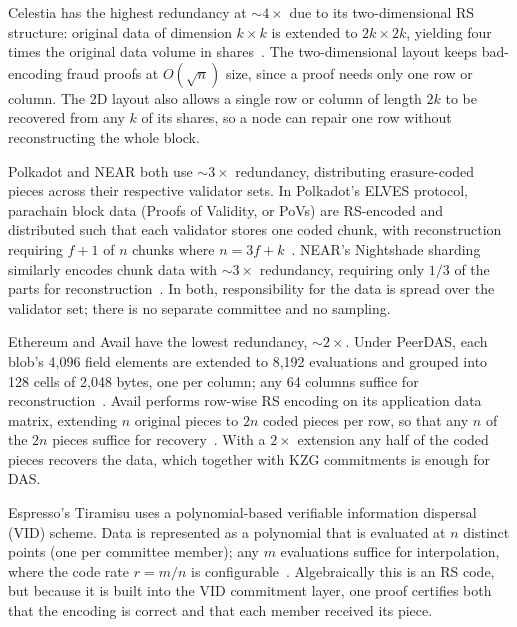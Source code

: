 Celestia has the highest redundancy at ${\sim}4\times$ due to its two-dimensional RS structure: original data of dimension $k \times k$ is extended to $2k \times 2k$, yielding four times the original data volume in shares~\cite{AlBassam_LazyLedger}.
The two-dimensional layout keeps bad-encoding fraud proofs at $O(\sqrt{n})$ size, since a proof needs only one row or column.
The 2D layout also allows a single row or column of length $2k$ to be recovered from any $k$ of its shares, so a node can repair one row without reconstructing the whole block.

Polkadot and NEAR both use ${\sim}3\times$ redundancy, distributing erasure-coded pieces across their respective validator sets.
In Polkadot's ELVES protocol, parachain block data (Proofs of Validity, or PoVs) are RS-encoded and distributed such that each validator stores one coded chunk, with reconstruction requiring $f{+}1$ of $n$ chunks where $n = 3f + k$~\cite{Jeff_Burdges_ELVES, Overview_of_polkadot}.
NEAR's Nightshade sharding similarly encodes chunk data with ${\sim}3\times$ redundancy, requiring only $1/3$ of the parts for reconstruction~\cite{NEAR_Nightshade_Scaling_Blockchain}.
In both, responsibility for the data is spread over the validator set; there is no separate committee and no sampling.

Ethereum and Avail have the lowest redundancy, ${\sim}2\times$.
Under PeerDAS, each blob's 4{,}096 field elements are extended to 8{,}192 evaluations and grouped into 128 cells of 2{,}048 bytes, one per column; any 64 columns suffice for reconstruction~\cite{EIP-7594}.
Avail performs row-wise RS encoding on its application data matrix, extending $n$ original pieces to $2n$ coded pieces per row, so that any $n$ of the $2n$ pieces suffice for recovery~\cite{Avail_The_DA_Blockchain}.
With a $2\times$ extension any half of the coded pieces recovers the data, which together with KZG commitments is enough for DAS.

Espresso's Tiramisu uses a polynomial-based verifiable information dispersal (VID) scheme.
Data is represented as a polynomial that is evaluated at $n$ distinct points (one per committee member); any $m$ evaluations suffice for interpolation, where the code rate $r = m/n$ is configurable~\cite{Espresso:Hotshot_and_Triamisu}.
Algebraically this is an RS code, but because it is built into the VID commitment layer, one proof certifies both that the encoding is correct and that each member received its piece.

